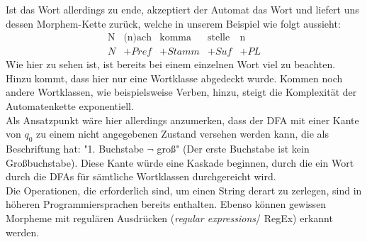 \documentclass[12pt,twoside]{article}
\theoremstyle{plain}
\theoremstyle{definition}
\theoremstyle{remark}
\begin{document}
Ist das Wort allerdings zu ende, akzeptiert der Automat das Wort und liefert uns dessen Morphem-Kette zurück, welche in unserem Beispiel wie folgt aussieht:
\begin{equation*}
\begin{array}{ccccc}
	\text{N} & \text{(n)ach} & \text{komma} & \text{stelle} & \text{n}	\\
	N & +Pref & +Stamm & +Suf & +PL
\end{array}
\end{equation*}
Wie hier zu sehen ist, ist bereits bei einem einzelnen Wort viel zu beachten.
Hinzu kommt, dass hier nur eine Wortklasse abgedeckt wurde.
Kommen noch andere Wortklassen, wie beispielsweise Verben, hinzu, steigt die Komplexität der Automatenkette exponentiell.\\
Als Ansatzpunkt wäre hier allerdings anzumerken, dass der DFA mit einer Kante von $q_0$ zu einem nicht angegebenen Zustand versehen werden kann, die als Beschriftung hat: "1. Buchstabe $\lnot$ groß" (Der erste Buchstabe ist kein Großbuchstabe).
Diese Kante würde eine Kaskade beginnen, durch die ein Wort durch die DFAs für sämtliche Wortklassen durchgereicht wird.\\
Die Operationen, die erforderlich sind, um einen String derart zu zerlegen, sind in höheren Programmiersprachen bereits enthalten.
Ebenso können gewissen Morpheme mit regulären Ausdrücken (\textit{regular expressions}/ RegEx) erkannt werden.
\end{document}
